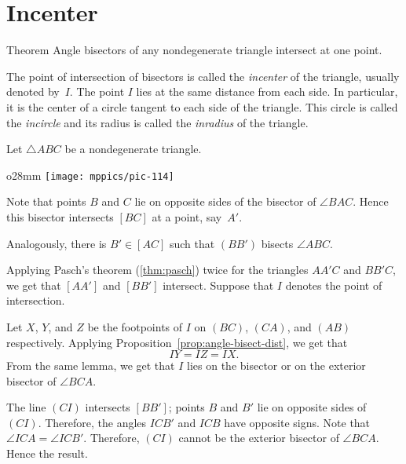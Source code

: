 \section{Incenter}

\begin{thm}[\abs]{Theorem}\label{thm:incenter}
Angle bisectors of any nondegenerate triangle intersect at one point.
\end{thm}


The point of intersection of bisectors is called the \emph{incenter} of the triangle, 
usually denoted by~$I$.
The point $I$ lies at the same distance from each side.
In particular, it is the center of a circle tangent to each side of the triangle.
This circle is called 
the \emph{incircle} and its radius is called 
the \emph{inradius} of the triangle.

Let $\triangle ABC$ be a nondegenerate triangle.

\begin{wrapfigure}{o}{28mm}
\vskip-2mm
\centering
\texttt{[image: mppics/pic-114]}
\end{wrapfigure}

Note that points $B$ and $C$ lie on opposite sides of the bisector of $\angle BAC$.
Hence this bisector intersects $[BC]$ at a point, say~$A'$.

Analogously, there is $B'\in[AC]$ 
such that $(BB')$ bisects $\angle ABC$.

Applying Pasch's theorem (\ref{thm:pasch}) twice
for the triangles $AA'C$ and $BB'C$,
we get that $[AA']$ and $[BB']$ intersect.
Suppose that $I$ denotes the point of intersection.

Let $X$, $Y$, and $Z$ be the footpoints of $I$ on  $(B C)$, $(C A)$, and $(A B)$ respectively.
Applying Proposition~\ref{prop:angle-bisect-dist}, we get that
$$I Y=I Z=I X.$$
From the same lemma, we get that $I$ lies on the bisector or on the exterior bisector of $\angle B C A$.

The line $(C I)$ intersects $[B B']$;
points $B$ and $B'$ lie on opposite sides of~$(C I)$.
Therefore, the angles $I C B'$ and $I C B$ have opposite signs.
Note that $\angle I C A=\angle I C B'$.
Therefore, $(C I)$ cannot be the exterior bisector of $\angle B C A$.
Hence the result.
\qeds

